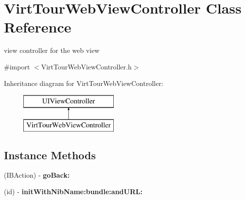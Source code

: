 \hypertarget{interface_virt_tour_web_view_controller}{\section{Virt\-Tour\-Web\-View\-Controller Class Reference}
\label{interface_virt_tour_web_view_controller}
}


view controller for the web view  




{\ttfamily \#import $<$Virt\-Tour\-Web\-View\-Controller.\-h$>$}

Inheritance diagram for Virt\-Tour\-Web\-View\-Controller\-:\begin{figure}[H]
\begin{center}
\leavevmode
\includegraphics[height=2.000000cm]{interface_virt_tour_web_view_controller}
\end{center}
\end{figure}
\subsection*{Instance Methods}
\begin{DoxyCompactItemize}
\item 
\hypertarget{interface_virt_tour_web_view_controller_a1d9d9ea9174dbe585defec80bdd99fe5}{(I\-B\-Action) -\/ {\bfseries go\-Back\-:}}\label{interface_virt_tour_web_view_controller_a1d9d9ea9174dbe585defec80bdd99fe5}

\item 
\hypertarget{interface_virt_tour_web_view_controller_a7e16a3163a788c4d99cd1ebd77659a4d}{(id) -\/ {\bfseries init\-With\-Nib\-Name\-:bundle\-:and\-U\-R\-L\-:}}\label{interface_virt_tour_web_view_controller_a7e16a3163a788c4d99cd1ebd77659a4d}

\end{DoxyCompactItemize}
